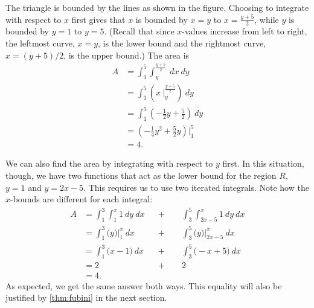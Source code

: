 {The triangle is bounded by the lines as shown in the figure. Choosing to integrate with respect to $x$ first gives that $x$ is bounded by $x=y$ to $x = \frac{y+5}2$, while $y$ is bounded by $y=1$ to $y=5$. (Recall that since $x$-values increase from left to right, the leftmost curve, $x=y$, is the lower bound and the rightmost curve, $x=(y+5)/2$, is the upper bound.) The area is
\begin{align*}
A &= \int_1^5\int_{y}^{\frac{y+5}2}\ dx\ dy \\
 &= \int_1^5\left(x\ \Big|_y^{\frac{y+5}2}\right)\ dy \\
&= \int_1^5 \left(-\frac12y+\frac52\right)\ dy \\
&= \left(-\frac14y^2+\frac52y\right)\Big|_1^5\\
&=4.
\end{align*}

We can also find the area by integrating with respect to $y$ first. In this situation, though, we have two functions that act as the lower bound for the region $R$, $y=1$ and $y=2x-5$. This requires us to use two iterated integrals. Note how the $x$-bounds are different for each integral:
\begin{align*}
 A
 &= \int_1^3\int_1^x 1\ dy \ dx &&+\qquad\int_3^5\int_{2x-5}^x1\ dy\ dx\\
 &= \int_1^3\big(y\big)\Big|_1^x\ dx &&+\qquad\int_3^5\big(y\big)\Big|_{2x-5}^x\ dx\\
 &= \int_1^3\big(x-1\big)\ dx &&+\qquad\int_3^5\big(-x+5\big)\ dx \\
 &= 2 &&+\qquad2 \\
 &=4.
\end{align*}
As expected, we get the same answer both ways.  This equality will also be justified by \autoref{thm:fubini} in the next section.}

